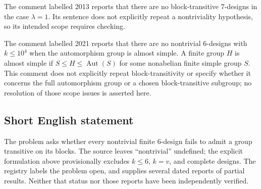 \documentclass[11pt]{article}
\begin{document}
The comment labelled 2013 reports that there are no block-transitive \(7\)-designs in the case \(\lambda=1\). Its sentence does not explicitly repeat a nontriviality hypothesis, so its intended scope requires checking.

The comment labelled 2021 reports that there are no nontrivial \(6\)-designs with \(k\leq10^4\) when the automorphism group is almost simple. A finite group \(H\) is almost simple if \(S\leq H\leq\operatorname{Aut}(S)\) for some nonabelian finite simple group \(S\). This comment does not explicitly repeat block-transitivity or specify whether it concerns the full automorphism group or a chosen block-transitive subgroup; no resolution of those scope issues is asserted here.
\subsection{Short English statement}
The problem asks whether every nontrivial finite \(6\)-design fails to admit a group transitive on its blocks. The source leaves ``nontrivial'' undefined; the explicit formulation above provisionally excludes \(k\leq6\), \(k=v\), and complete designs. The registry labels the problem open, and supplies several dated reports of partial results. Neither that status nor those reports have been independently verified.
\end{document}
